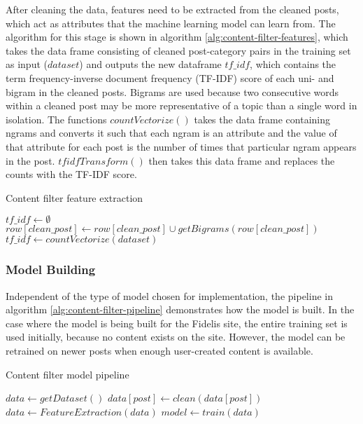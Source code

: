 After cleaning the data, features need to be extracted from the cleaned posts, which act as attributes that the machine learning model can learn from. The algorithm for this stage is shown in algorithm \ref{alg:content-filter-features}, which takes the data frame consisting of cleaned post-category pairs in the training set as input ($dataset$) and outputs the new dataframe $tf\_idf$, which contains the term frequency-inverse document frequency (TF-IDF) score of each uni- and bigram in the cleaned posts. Bigrams are used because two consecutive words within a cleaned post may be more representative of a topic than a single word in isolation. The functions $countVectorize()$ takes the data frame containing ngrams and converts it such that each ngram is an attribute and the value of that attribute for each post is the number of times that particular ngram appears in the post. $tfidfTransform()$ then takes this data frame and replaces the counts with the TF-IDF score.

\begin{algorithm}[H]
\caption{Content filter feature extraction}
\label{alg:content-filter-features}
\begin{algorithmic}[1]
\State $tf\_idf\gets \emptyset$
	\State $row[clean\_post]\gets row[clean\_post]\cup getBigrams(row[clean\_post])$
\EndFor
\State $tf\_idf\gets countVectorize(dataset)$
\State {}
\EndFunction
\end{algorithmic}
\end{algorithm}

\subsubsection{Model Building}
Independent of the type of model chosen for implementation, the pipeline in algorithm \ref{alg:content-filter-pipeline} demonstrates how the model is built. In the case where the model is being built for the Fidelis site, the entire training set is used initially, because no content exists on the site. However, the model can be retrained on newer posts when enough user-created content is available.

\begin{algorithm}[H]
\caption{Content filter model pipeline}
\label{alg:content-filter-pipeline}
\begin{algorithmic}[1]
\State $data\gets getDataset()$
	\State $data[post]\gets clean(data[post])$
\EndFor
\State $data\gets FeatureExtraction(data)$
\State $model \gets train(data)$
\end{algorithmic}
\end{algorithm}


